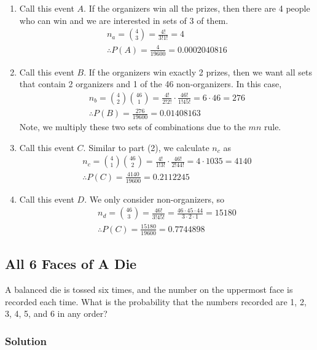\documentclass[11pt]{article}
\theoremstyle{definition}
\begin{document}
\begin{enumerate}
	\item Call this event $A$. If the organizers win all the prizes, then there are 4 people who can win and we are interested in sets of 3 of them.
	$$
		\begin{aligned}
			n_a = {4 \choose 3} = \frac{4!}{3!1!} = 4 \\
			\therefore P(A) = \frac{4}{19600} = 0.0002040816
		\end{aligned}
	$$
	\item Call this event $B$. If the organizers win exactly 2 prizes, then we want all sets that contain 2 organizers and 1 of the 46 non-organizers. In this case,
	$$
		\begin{aligned}
			n_b = {4 \choose 2} {46 \choose 1} = \frac{4!}{2!2!} \cdot \frac{46!}{1!45!} = 6 \cdot 46 = 276 \\
			\therefore P(B) =  \frac{276}{19600} = 0.01408163
		\end{aligned}
	$$
	Note, we multiply these two sets of combinations due to the $mn$ rule.
	\item Call this event $C$. Similar to part (2), we calculate $n_c$ as
	$$
		\begin{aligned}
			n_c = {4 \choose 1} {46 \choose 2} = \frac{4!}{1!3!} \cdot \frac{46!}{2!44!} = 4 \cdot 1035 = 4140 \\
			\therefore P(C) =  \frac{4140}{19600} = 0.2112245
		\end{aligned}
	$$
	\item Call this event $D$. We only consider non-organizers, so
	$$
		\begin{aligned}
			n_d = {46 \choose 3} = \frac{46!}{3!45!} = \frac{46 \cdot 45 \cdot 44}{3 \cdot 2 \cdot 1} = 15180 \\
			\therefore P(C) =  \frac{15180}{19600} = 0.7744898
		\end{aligned}
	$$
\end{enumerate}

\subsection{All 6 Faces of A Die}

A balanced die is tossed six times, and the number on the uppermost face is recorded each time. What is the probability that the numbers recorded are 1, 2, 3, 4, 5, and 6 in any order?

\subsubsection*{Solution}
\end{document}
